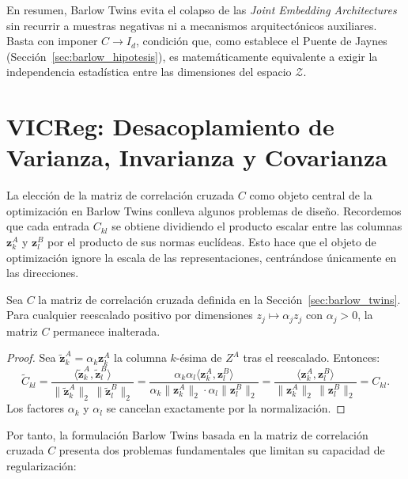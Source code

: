 En resumen, Barlow Twins evita el colapso de las \textit{Joint Embedding Architectures} sin recurrir a muestras negativas ni a mecanismos arquitectónicos auxiliares. Basta con imponer $C \to I_d$, condición que, como establece el Puente de Jaynes (Sección~\ref{sec:barlow_hipotesis}), es matemáticamente equivalente a exigir la independencia estadística entre las dimensiones del espacio $\mathcal{Z}$.

\section{VICReg: Desacoplamiento de Varianza, Invarianza y Covarianza}
\label{sec:vicreg}

La elección de la matriz de correlación cruzada $C$ como objeto central de la optimización en Barlow Twins conlleva algunos problemas de diseño. Recordemos que cada entrada $C_{kl}$ se obtiene dividiendo el producto escalar entre las columnas $\mathbf{z}_k^A$ y $\mathbf{z}_l^B$ por el producto de sus normas euclídeas. Esto hace que el objeto de optimización ignore la escala de las representaciones, centrándose únicamente en las direcciones.

\begin{proposition}
\label{prop:C_escala}
Sea $C$ la matriz de correlación cruzada definida en la Sección~\ref{sec:barlow_twins}. Para cualquier reescalado positivo por dimensiones $z_j \mapsto \alpha_j z_j$ con $\alpha_j > 0$, la matriz $C$ permanece inalterada.
\end{proposition}

\begin{proof}
Sea $\tilde{\mathbf{z}}_k^A = \alpha_k \mathbf{z}_k^A$ la columna $k$-ésima de $Z^A$ tras el reescalado. Entonces:
\begin{equation}
\tilde{C}_{kl} = \frac{\langle \tilde{\mathbf{z}}_k^A, \tilde{\mathbf{z}}_l^B \rangle}{\|\tilde{\mathbf{z}}_k^A\|_2 \, \|\tilde{\mathbf{z}}_l^B\|_2} = \frac{\alpha_k \alpha_l \langle \mathbf{z}_k^A, \mathbf{z}_l^B \rangle}{\alpha_k \|\mathbf{z}_k^A\|_2 \cdot \alpha_l \|\mathbf{z}_l^B\|_2} = \frac{\langle \mathbf{z}_k^A, \mathbf{z}_l^B \rangle}{\|\mathbf{z}_k^A\|_2 \, \|\mathbf{z}_l^B\|_2} = C_{kl}.
\end{equation}
Los factores $\alpha_k$ y $\alpha_l$ se cancelan exactamente por la normalización.
\end{proof}

Por tanto, la formulación Barlow Twins basada en la matriz de correlación cruzada $C$ presenta dos problemas fundamentales que limitan su capacidad de regularización:

